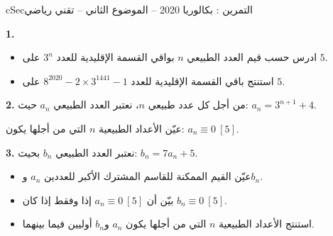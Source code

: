\documentclass[12pt,a4paper]{article}
\newenvironment{BOX}[2]{\begin{otherlanguage}{english}\begin{arbox}{#1}{#2}}{\end{arbox}\end{otherlanguage}}
\newcounter{exo}
\newenvironment{tamrin}[1]{\stepcounter{exo}\begin{BOX}{cSec}{التمرين \theexo: #1}}{\end{BOX}}
\newenvironment{sq}{\begin{itemize}[leftmargin=2.4em,itemsep=3pt]}{\end{itemize}}
\newcommand{\qa}{\item[(أ)]}\newcommand{\qb}{\item[(ب)]}\newcommand{\qc}{\item[(جـ)]}\newcommand{\qd}{\item[(د)]}\newcommand{\qe}{\item[(هـ)]}
\newcommand{\QQ}[1]{\par\smallskip\textbf{#1.} }
\begin{document}
\begin{tamrin}{بكالوريا 2020 -- الموضوع الثاني -- تقني رياضي}
\QQ{1}
\begin{sq}
\qa ادرس حسب قيم العدد الطبيعي $n$ بواقي القسمة الإقليدية للعدد $3^n$ على $5$.
\qb استنتج باقي القسمة الإقليدية للعدد $8^{2020}-2\times 3^{1441}-1$ على $5$.
\end{sq}
\QQ{2} من أجل كل عدد طبيعي $n$، نعتبر العدد الطبيعي $a_n$ حيث: $a_n=3^{n+1}+4$.

عيّن الأعداد الطبيعية $n$ التي من أجلها يكون: $a_n\equiv 0\ [5]$.
\QQ{3} نعتبر العدد الطبيعي $b_n$ بحيث: $b_n=7a_n+5$.
\begin{sq}
\qa عيّن القيم الممكنة للقاسم المشترك الأكبر للعددين $a_n$ و$b_n$.
\qb بيّن أن $a_n\equiv 0\ [5]$ إذا وفقط إذا كان $b_n\equiv 0\ [5]$.
\qc استنتج الأعداد الطبيعية $n$ التي من أجلها يكون $a_n$ و$b_n$ أوليين فيما بينهما.
\end{sq}
\end{tamrin}
\end{document}
